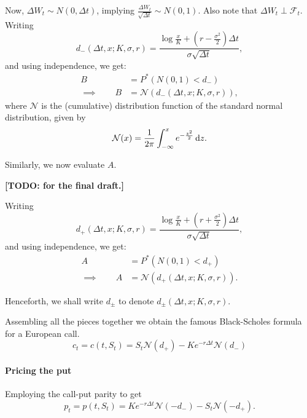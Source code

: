 Now, $ \Delta W_t \sim N(0, \Delta t) $, implying $ \frac{ \Delta W_t }{ \sqrt{\Delta t} } \sim N(0, 1) $. Also note that $ \Delta W_t \perp \mathcal{F}_t $. Writing 
\begin{equation*}
	d_- ( \Delta t, x; K, \sigma, r ) = \frac{ \log \frac{x}{K} + ( r - \frac{\sigma^2}{2} ) \Delta t }{ \sigma \sqrt{\Delta t} } ,
\end{equation*}
and using independence, we get:
\begin{align*}
	B  &=  P^* \left( N(0, 1)  <  d_- \right)  \\
	\implies  \qquad  B  &=  \mathcal{N}(d_- ( \Delta t, x; K, \sigma, r )),
\end{align*}
where $ \mathcal{N} $ is the (cumulative) distribution function of the standard normal distribution, given by
\begin{equation}
	\mathcal{N}(x) = \frac{1}{2 \pi} \int_{- \infty}^{x} e^{-\frac{z^2}{2}} \dif z .
\end{equation}


Similarly, we now evaluate $ A $.

\textbf{[TODO: for the final draft.]}

Writing 
\begin{equation*}
d_+ ( \Delta t, x; K, \sigma, r ) = \frac{ \log \frac{x}{K} + ( r + \frac{\sigma^2}{2} ) \Delta t }{ \sigma \sqrt{\Delta t} } ,
\end{equation*}
and using independence, we get:
\begin{align*}
A  &=  P^* \left( N(0, 1)  <  d_+ \right)  \\
\implies  \qquad  A  &=  \mathcal{N}(d_+ ( \Delta t, x; K, \sigma, r )).
\end{align*}

Henceforth, we shall write $ d_\pm $ to denote $ d_\pm ( \Delta t, x; K, \sigma, r ) $.

Assembling all the pieces together we obtain the famous Black-Scholes formula for a European call.
\begin{equation}
	\label{eq:continous-call-pr}
	c_t = c(t, S_t) = S_t \mathcal{N}(d_+) - K e^{-r \Delta t} \mathcal{N}(d_-)
\end{equation}


\paragraph{Pricing the put}
Employing the call-put parity to get
\begin{equation}
	\label{eq:continous-put-pr}
	p_t = p(t, S_t) = K e^{-r \Delta t} \mathcal{N}(- d_-) - S_t \mathcal{N}(- d_+).
\end{equation}


